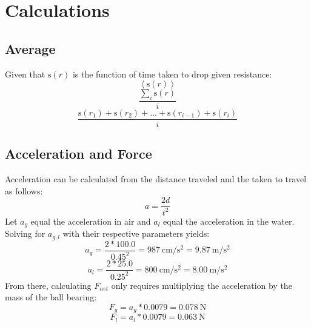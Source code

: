 \documentclass[a4paper]{article}
\def\mean#1{\left< #1 \right>}
\begin{document}
    \section{Calculations}
        \subsection{Average}
            \begin{center}
                Given that $\si\s(r)$ is the function of time taken to drop given
                resistance:
                \begin{equation}
                    \mean{\si\s(r)}
                \end{equation}
                \begin{equation}
                    \frac{\displaystyle\sum_i{\si\s(r)}}{i}
                \end{equation}
                \begin{equation}
                    \frac{\si\s(r_1)+\si\s(r_2)+...+\si\s(r_{i-1})+\si\s(r_i)}{i}
                \end{equation}
            \end{center}
        \subsection{Acceleration and Force}
            \begin{center}
                Acceleration can be calculated from the distance traveled and the
                taken to travel as follows:
                \begin{equation}
                    a=\frac{2d}{t^2}
                \end{equation}
                Let $a_g$ equal the acceleration in air and $a_l$ equal the acceleration
                in the water. Solving for $a_{g,l}$ with their respective parameters
                yields:
                \begin{equation}
                    a_g=\frac{2*100.0}{0.45^2}=\SI{987}{\cm\per\s\squared}=\SI{9.87}{\m\per\s\squared}
                \end{equation}
                \begin{equation}
                    a_l=\frac{2*25.0}{0.25^2}=\SI{800}{\cm\per\s\squared}=\SI{8.00}{\m\per\s\squared}
                \end{equation}
                From there, calculating $F_{net}$ only requires multiplying the acceleration
                by the mass of the ball bearing:
                \begin{equation}
                    F_g=a_g*0.0079=\SI{0.078}{\N}
                \end{equation}
                \begin{equation}
                    F_l=a_l*0.0079=\SI{0.063}{\N}
                \end{equation}
            \end{center}
\end{document}
